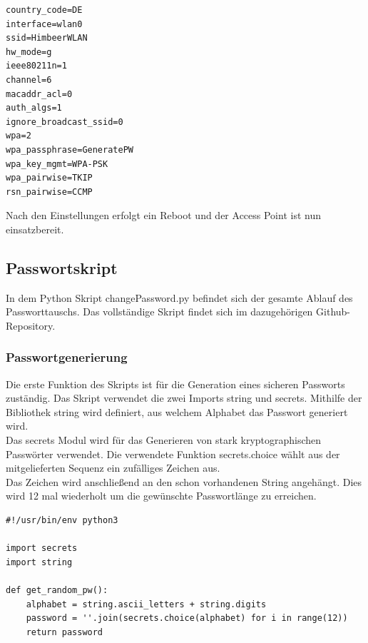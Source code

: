 \documentclass[a4paper,11pt,singlespacing]{article}
\begin{document}
                
                    \begin{lstlisting}
country_code=DE
interface=wlan0
ssid=HimbeerWLAN
hw_mode=g
ieee80211n=1
channel=6
macaddr_acl=0
auth_algs=1
ignore_broadcast_ssid=0
wpa=2
wpa_passphrase=GeneratePW
wpa_key_mgmt=WPA-PSK
wpa_pairwise=TKIP
rsn_pairwise=CCMP
                    \end{lstlisting} 
                   
                   Nach den Einstellungen erfolgt ein Reboot und der Access Point ist nun einsatzbereit.
                
     \subsection{Passwortskript}           
            In dem Python Skript changePassword.py befindet sich der gesamte Ablauf des Passworttauschs.  Das vollständige Skript findet sich im dazugehörigen Github-Repository.\cite{Quote_github_repo}
            
    	\subsubsection{Passwortgenerierung}
    		Die erste Funktion des Skripts ist für die Generation eines sicheren Passworts zuständig. Das Skript verwendet die zwei Imports string und secrets. Mithilfe der Bibliothek string wird definiert, aus welchem Alphabet das Passwort generiert wird.\\ 				Das secrets Modul wird für das Generieren von stark kryptographischen Passwörter verwendet. Die verwendete Funktion secrets.choice wählt aus der mitgelieferten Sequenz ein zufälliges Zeichen aus. \\
    		Das Zeichen wird anschließend an den schon vorhandenen String angehängt. Dies wird 12 mal wiederholt um die gewünschte Passwortlänge zu erreichen.
    	
    	

\begin{lstlisting}            
#!/usr/bin/env python3

import secrets
import string

def get_random_pw():
	alphabet = string.ascii_letters + string.digits
	password = ''.join(secrets.choice(alphabet) for i in range(12))
	return password
	
\end{lstlisting}
    	
\end{document}
